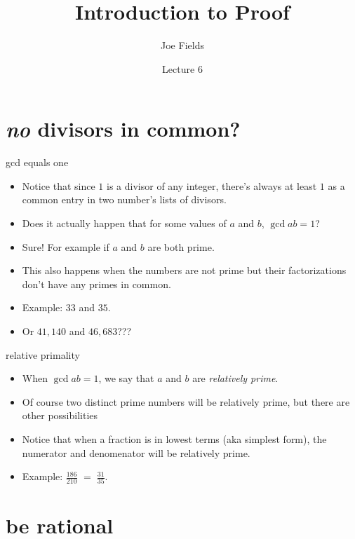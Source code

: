 \documentclass[landscape]{beamer}
\author{Joe Fields}
\title{Introduction to Proof}
\date{Lecture 6}
\institute[SCSU]{ {\tt fieldsj1@southernct.edu} }
\begin{document}
\begin{frame}[plain]
  \titlepage
\end{frame}


\section{{\em no} divisors in common?}

\begin{frame}{gcd equals one}
\begin{itemize}
\item Notice that since $1$ is a divisor of any integer, there's always at least $1$ as a common entry in two number's lists of divisors. \pause
\item Does it actually happen that for some values of $a$ and $b$, $\gcd{a}{b} = 1$? \pause
\item Sure!  For example if $a$ and $b$ are both prime.\pause
\item This also happens when the numbers are not prime but their factorizations don't have any primes in common. \pause
\item Example: $33$ and $35$. \pause
\item Or $41,140$ and $46,683$???
\end{itemize}
\end{frame}

\begin{frame}{relative primality}
\begin{itemize}
\item When $\gcd{a}{b} = 1$, we say that $a$ and $b$ are {\em relatively prime}. \pause
\item Of course two distinct prime numbers will be relatively prime, but there are other possibilities\textellipsis \pause
\item Notice that when a fraction is in lowest terms (aka simplest form), the numerator and denomenator will be relatively prime.\pause
\item Example: $\displaystyle \frac{186}{210} $ \pause \hspace{.1in} $\displaystyle = \; \frac{31}{35}.$ 
\end{itemize}
\end{frame}

\section{be rational}
\end{document}
